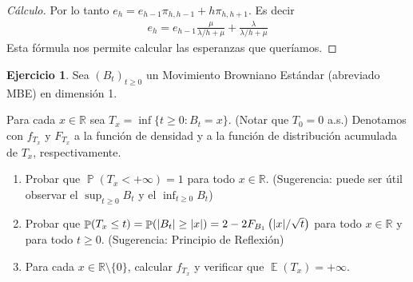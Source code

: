\documentclass{article}
\DeclareMathOperator{\prob}{\mathbb{P}}
\DeclareMathOperator{\Expectation}{\mathbb{E}}
\newcommand{\realnum}{\mathbb{R}}
\newcommand{\brownian}{B}
\newcommand{\wiener}{W}
\theoremstyle{definition}
\newtheorem{exercise}{Ejercicio}
\begin{document}
\begin{proof}[Cálculo]
Por lo tanto \(e_h = e_{h - 1} \pi_{h, h - 1} + h \pi_{h, h + 1}\).
Es decir
\begin{align}
	e_h = e_{h - 1} \frac{\mu}{\lambda / h + \mu} + \frac{\lambda}{\lambda / h + \mu}
\end{align}
Esta fórmula nos permite calcular las esperanzas que queríamos.
\end{proof}
\endgroup
\newpage
\begingroup
\newcommand{\brownianProcess}{(\brownian_t)_{t \geq 0}}
\newcommand{\reflectedBrownian}{\widetilde{\brownian}}
\newcommand{\wienerProcess}{(\wiener_t)_{t \geq 0}}
\begin{exercise}
Sea $\brownianProcess$ un Movimiento Browniano Estándar (abreviado MBE) en dimensión 1.

Para cada $x \in \realnum$ sea $T_x = \inf \{t \geq 0 : \brownian_t = x\}$.
(Notar que \(T_0 = 0\) a.s.)
Denotamos con \(f_{T_x}\) y \(F_{T_x}\) a la función de densidad y a la función de distribución acumulada de \(T_x\), respectivamente.
\begin{enumerate}[label=\alph*), ref=\theexercise.\labelenumi]
	\item \label{exercise:3.a)} 
	Probar que \(\prob(T_x < + \infty) = 1\) para todo \(x \in \realnum\).
	(Sugerencia: puede ser útil observar el \(\sup_{t \geq 0} \brownian_t\) y el \(\inf_{t \geq 0} \brownian_t\))
	\item \label{exercise:3.b)}
	Probar que \(\prob(T_x \leq t) = \prob(\abs{\brownian_t} \geq \abs{x}) = 2 - 2 F_{\brownian_1} \left( \abs{x} / \sqrt{t} \right)\) para todo \(x \in \realnum\) y para todo \(t \geq 0\).
	(Sugerencia: Principio de Reflexión)
	\item 
	\label{exercise:3.c)}
	Para cada \(x \in \realnum \setminus \{0\}\), calcular \(f_{T_x}\) y verificar que \(\Expectation(T_x) = + \infty\).
\end{enumerate}
\end{exercise}
\end{document}
